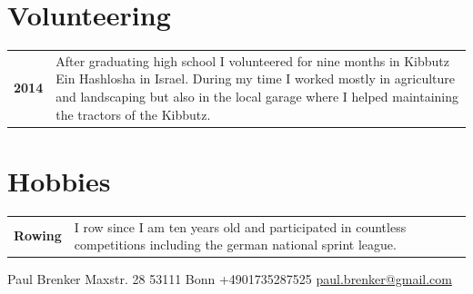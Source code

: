 \documentclass{modernsimplecv}
\newlength{\rightcolwidth}
\newlength{\leftcolwidth}
\begin{document}
\begin{paracol}{2}
\begin{minipage}[t]{\leftcolwidth}
  \end{minipage}\hfill






\vspace{2em}


\begin{minipage}[t]{\rightcolwidth}
\section*{Volunteering}
\begin{tabular}{>{\footnotesize\bfseries}r >{\footnotesize}p{}}
    2014 & After graduating high school I volunteered for nine months in Kibbutz Ein Hashlosha in Israel. During my time I worked mostly in agriculture and landscaping but also in the local garage where I helped maintaining the tractors of the Kibbutz. \\
    
\end{tabular}
\bigskip

\section*{Hobbies}
\begin{tabular}{>{\footnotesize\bfseries}r >{\footnotesize}p{}}
    Rowing & I row since I am ten years old and participated in countless competitions including the german national sprint league. \\

\end{tabular}
\end{minipage}









\end{paracol}

\vfill{} %

\setlength{\parindent}{0pt}
\begin{minipage}[t]{\textwidth}
\begin{center}\fontfamily{\sfdefault}\selectfont \color{black!70}
{\small Paul Brenker  Maxstr. 28  53111 Bonn  +4901735287525 
 \protect\url{paul.brenker@gmail.com}
}
\end{center}
\end{minipage}
\end{document}
